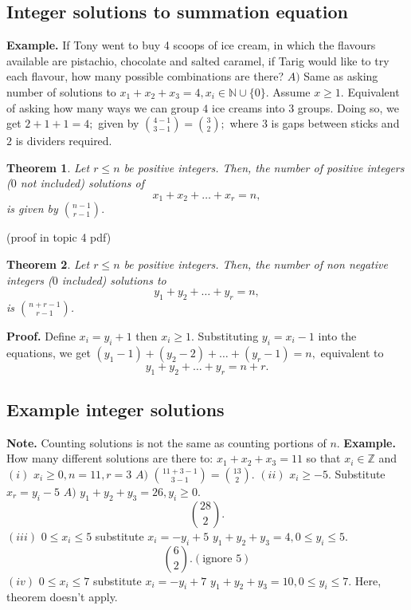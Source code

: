 \documentclass{article}
\newtheorem{theorem}{Theorem}                                       %
\begin{document}
\subsection{Integer solutions to summation equation}
\textbf{Example. } If Tony went to buy 4 scoops of ice cream, in which the flavours available are
pistachio, chocolate and salted caramel, if Tarig would like to try each flavour, how many
possible combinations are there?
\newline
\newline
$A) $ Same as asking number of solutions to $x_1 + x_2 + x_3 = 4, x_i \in \mathbb{N} \cup \{ 0 \}.$
\newline
Assume $x \geq 1.$ Equivalent of asking how many ways we can group $4$ ice creams into $3$ groups. Doing so, we get
$2 + 1 + 1 = 4;$ given by $\binom{4 - 1}{3 - 1} = \binom{3 }{2};$ where $3$ is gaps between sticks and $2$ is dividers required.
\newline
\begin{theorem}
  Let $r \leq n$ be positive integers. Then, the number of positive integers
  ($0$ not included) solutions of
  $$x_1 + x_2 + \dots + x_r = n,$$
  is given by $\binom{n - 1}{r - 1}.$
\end{theorem}
(proof in topic 4 pdf)
\newline
\newline
\begin{theorem}
  Let $r \leq n$ be positive integers. Then, the number of non negative integers
  ($0$ included) solutions to 
  $$y_1 + y_2 + \dots + y_r = n,$$
  is $\binom{n + r - 1}{r - 1}$.
\end{theorem}
\textbf{Proof. } Define $x_i = y_i + 1$ then $x_i \geq 1$. 
\newline
Substituting $y_i = x_i - 1$ into the equations, we get $(y_1 - 1) + (y_2 - 2) + \dots + (y_r - 1) = n,$
\newline
equivalent to
$$y_1 + y_2 + \dots + y_r = n + r.$$
\newpage
\subsection{Example integer solutions}
\textbf{Note. }Counting solutions is not the same as counting portions of $n$.
\newline
\newline
\textbf{Example. } How many different solutions are there to:
$x_1 + x_2 + x_3 = 11$ so that $x_i \in \mathbb{Z}$ and 
\newline
\newline
$(i) $ $x_i \geq 0, n = 11, r = 3$
\newline
$A) $ $\binom{11 + 3 - 1}{3 - 1} = \binom{13}{2}.$
\newline
$(ii) $ $x_i \geq -5$. Substitute $x_r = y_i - 5$ 
\newline
$A) $ $y_1 + y_2 + y_3 = 26, y_i \geq 0.$
\newline
$$\binom{28}{2}.$$
$(iii) $ $0 \leq x_i \leq 5$ substitute $x_i = -y_i + 5$
\newline
$y_1 + y_2 + y_3 = 4, 0 \leq y_i \leq 5.$
$$ \binom{6}{2}. (\text{ignore }5)$$
$(iv) $ $0 \leq x_i \leq 7$ substitute $x_i = -y_i + 7$
\newline
$y_1 + y_2 + y_3 = 10, 0 \leq y_i \leq 7.$
Here, theorem doesn't apply.
\newpage
\end{document}
